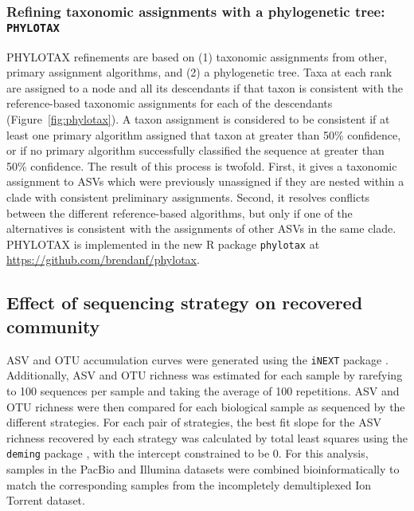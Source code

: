 \documentclass[
]{article}
\begin{document}
\hypertarget{refining-taxonomic-assignments-with-a-phylogenetic-tree-phylotax}{%
\subsubsection{\texorpdfstring{Refining taxonomic assignments with a phylogenetic tree: \texttt{PHYLOTAX}}{Refining taxonomic assignments with a phylogenetic tree: PHYLOTAX}}\label{refining-taxonomic-assignments-with-a-phylogenetic-tree-phylotax}}

PHYLOTAX refinements are based on (1) taxonomic assignments from other, primary assignment algorithms, and (2) a phylogenetic tree.
Taxa at each rank are assigned to a node and all its descendants if that taxon is consistent with the reference-based taxonomic assignments for each of the descendants (Figure~\ref{fig:phylotax}).
A taxon assignment is considered to be consistent if at least one primary algorithm assigned that taxon at greater than 50\% confidence, or if no primary algorithm successfully classified the sequence at greater than 50\% confidence.
The result of this process is twofold.
First, it gives a taxonomic assignment to ASVs which were previously unassigned if they are nested within a clade with consistent preliminary assignments.
Second, it resolves conflicts between the different reference-based algorithms, but only if one of the alternatives is consistent with the assignments of other ASVs in the same clade.
PHYLOTAX is implemented in the new R package \texttt{phylotax} at \url{https://github.com/brendanf/phylotax}.

\hypertarget{sequencing-strategy-supplement}{%
\subsection{Effect of sequencing strategy on recovered community}\label{sequencing-strategy-supplement}}

ASV and OTU accumulation curves were generated using the \texttt{iNEXT} package \autocite{hsieh2016}.
Additionally, ASV and OTU richness was estimated for each sample by rarefying to 100 sequences per sample and taking the average of 100 repetitions.
ASV and OTU richness were then compared for each biological sample as sequenced by the different strategies.
For each pair of strategies, the best fit slope for the ASV richness recovered by each strategy was calculated by total least squares using the \texttt{deming} package \autocite{R-deming}, with the intercept constrained to be 0.
For this analysis, samples in the PacBio and Illumina datasets were combined bioinformatically to match the corresponding samples from the incompletely demultiplexed Ion Torrent dataset.
\end{document}
